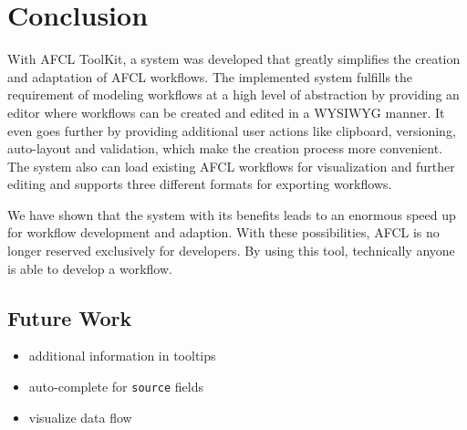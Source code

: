 \documentclass[a4paper,top=25mm,bottom=25mm,12pt,pdftex,halfparskip,twoside,bibtotoc,numbers=noenddot]{scrbook}
\begin{document}

\chapter{Conclusion}

With AFCL ToolKit, a system was developed that greatly simplifies the creation and adaptation of AFCL workflows. 
The implemented system fulfills the requirement of modeling workflows at a high level of abstraction by providing an editor where workflows can be created and edited in a WYSIWYG manner. It even goes further by providing additional user actions like clipboard, versioning, auto-layout and validation, which make the creation process more convenient.
The system also can load existing AFCL workflows for visualization and further editing and supports three different formats for exporting workflows.

We have shown that the system with its benefits leads to an enormous speed up for workflow development and adaption.
With these possibilities, AFCL is no longer reserved exclusively for developers. By using this tool, technically anyone is able to develop a workflow.

\section{Future Work}

\begin{itemize}
	\item additional information in tooltips
	\item auto-complete for \texttt{source} fields
	\item visualize data flow
\end{itemize}



\printbibliography
\end{document}
